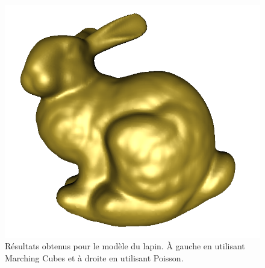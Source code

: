 \documentclass[french]{article}
\begin{document}
\begin{figure}[h]
\begin{minipage}{0.47\linewidth}
		\includegraphics[width=\linewidth]{bunnypoisson00.png}
	\end{minipage}
	\caption{Résultats obtenus pour le modèle du lapin. À gauche en utilisant Marching Cubes et à droite en utilisant Poisson.}
	\label{fig:meshlabbunny}
\end{figure}
\end{document}
